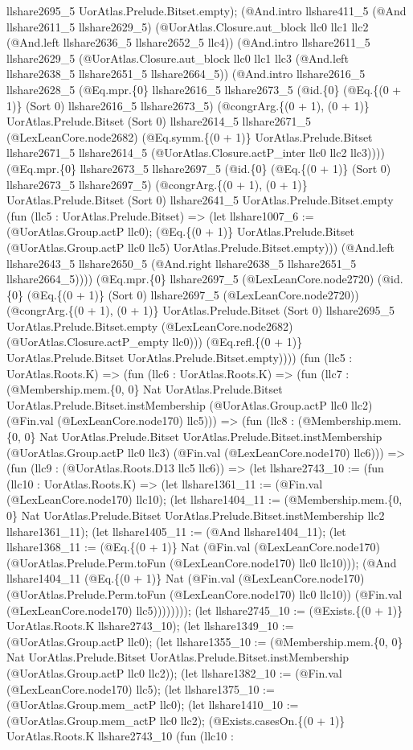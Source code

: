 \documentclass[11pt]{article}
\begin{document}
llshare2695\_5 UorAtlas.Prelude.Bitset.empty); (@And.intro llshare411\_5 (@And llshare2611\_5 llshare2629\_5) (@UorAtlas.Closure.aut\_block llc0 llc1 llc2 (@And.left llshare2636\_5 llshare2652\_5 llc4)) (@And.intro llshare2611\_5 llshare2629\_5 (@UorAtlas.Closure.aut\_block llc0 llc1 llc3 (@And.left llshare2638\_5 llshare2651\_5 llshare2664\_5)) (@And.intro llshare2616\_5 llshare2628\_5 (@Eq.mpr.\{0\} llshare2616\_5 llshare2673\_5 (@id.\{0\} (@Eq.\{(0 + 1)\} (Sort 0) llshare2616\_5 llshare2673\_5) (@congrArg.\{(0 + 1), (0 + 1)\} UorAtlas.Prelude.Bitset (Sort 0) llshare2614\_5 llshare2671\_5 (@LexLeanCore.node2682) (@Eq.symm.\{(0 + 1)\} UorAtlas.Prelude.Bitset llshare2671\_5 llshare2614\_5 (@UorAtlas.Closure.actP\_inter llc0 llc2 llc3)))) (@Eq.mpr.\{0\} llshare2673\_5 llshare2697\_5 (@id.\{0\} (@Eq.\{(0 + 1)\} (Sort 0) llshare2673\_5 llshare2697\_5) (@congrArg.\{(0 + 1), (0 + 1)\} UorAtlas.Prelude.Bitset (Sort 0) llshare2641\_5 UorAtlas.Prelude.Bitset.empty (fun (llc5 : UorAtlas.Prelude.Bitset) => (let llshare1007\_6 := (@UorAtlas.Group.actP llc0); (@Eq.\{(0 + 1)\} UorAtlas.Prelude.Bitset (@UorAtlas.Group.actP llc0 llc5) UorAtlas.Prelude.Bitset.empty))) (@And.left llshare2643\_5 llshare2650\_5 (@And.right llshare2638\_5 llshare2651\_5 llshare2664\_5)))) (@Eq.mpr.\{0\} llshare2697\_5 (@LexLeanCore.node2720) (@id.\{0\} (@Eq.\{(0 + 1)\} (Sort 0) llshare2697\_5 (@LexLeanCore.node2720)) (@congrArg.\{(0 + 1), (0 + 1)\} UorAtlas.Prelude.Bitset (Sort 0) llshare2695\_5 UorAtlas.Prelude.Bitset.empty (@LexLeanCore.node2682) (@UorAtlas.Closure.actP\_empty llc0))) (@Eq.refl.\{(0 + 1)\} UorAtlas.Prelude.Bitset UorAtlas.Prelude.Bitset.empty)))) (fun (llc5 : UorAtlas.Roots.K) => (fun (llc6 : UorAtlas.Roots.K) => (fun (llc7 : (@Membership.mem.\{0, 0\} Nat UorAtlas.Prelude.Bitset UorAtlas.Prelude.Bitset.instMembership (@UorAtlas.Group.actP llc0 llc2) (@Fin.val (@LexLeanCore.node170) llc5))) => (fun (llc8 : (@Membership.mem.\{0, 0\} Nat UorAtlas.Prelude.Bitset UorAtlas.Prelude.Bitset.instMembership (@UorAtlas.Group.actP llc0 llc3) (@Fin.val (@LexLeanCore.node170) llc6))) => (fun (llc9 : (@UorAtlas.Roots.D13 llc5 llc6)) => (let llshare2743\_10 := (fun (llc10 : UorAtlas.Roots.K) => (let llshare1361\_11 := (@Fin.val (@LexLeanCore.node170) llc10); (let llshare1404\_11 := (@Membership.mem.\{0, 0\} Nat UorAtlas.Prelude.Bitset UorAtlas.Prelude.Bitset.instMembership llc2 llshare1361\_11); (let llshare1405\_11 := (@And llshare1404\_11); (let llshare1368\_11 := (@Eq.\{(0 + 1)\} Nat (@Fin.val (@LexLeanCore.node170) (@UorAtlas.Prelude.Perm.toFun (@LexLeanCore.node170) llc0 llc10))); (@And llshare1404\_11 (@Eq.\{(0 + 1)\} Nat (@Fin.val (@LexLeanCore.node170) (@UorAtlas.Prelude.Perm.toFun (@LexLeanCore.node170) llc0 llc10)) (@Fin.val (@LexLeanCore.node170) llc5)))))))); (let llshare2745\_10 := (@Exists.\{(0 + 1)\} UorAtlas.Roots.K llshare2743\_10); (let llshare1349\_10 := (@UorAtlas.Group.actP llc0); (let llshare1355\_10 := (@Membership.mem.\{0, 0\} Nat UorAtlas.Prelude.Bitset UorAtlas.Prelude.Bitset.instMembership (@UorAtlas.Group.actP llc0 llc2)); (let llshare1382\_10 := (@Fin.val (@LexLeanCore.node170) llc5); (let llshare1375\_10 := (@UorAtlas.Group.mem\_actP llc0); (let llshare1410\_10 := (@UorAtlas.Group.mem\_actP llc0 llc2); (@Exists.casesOn.\{(0 + 1)\} UorAtlas.Roots.K llshare2743\_10 (fun (llc10 : 
\end{document}
